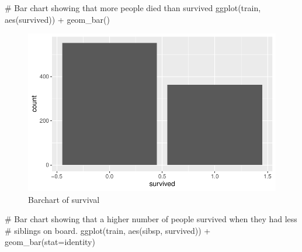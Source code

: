 \documentclass[
  letterpaper,
  DIV=11,
  numbers=noendperiod]{scrartcl}
\newenvironment{Shaded}{\begin{snugshade}}{\end{snugshade}}
\newcommand{\AttributeTok}[1]{\textcolor[rgb]{0.40,0.45,0.13}{#1}}
\newcommand{\CommentTok}[1]{\textcolor[rgb]{0.37,0.37,0.37}{#1}}
\newcommand{\FunctionTok}[1]{\textcolor[rgb]{0.28,0.35,0.67}{#1}}
\newcommand{\NormalTok}[1]{\textcolor[rgb]{0.00,0.23,0.31}{#1}}
\newcommand{\SpecialCharTok}[1]{\textcolor[rgb]{0.37,0.37,0.37}{#1}}
\newcommand{\StringTok}[1]{\textcolor[rgb]{0.13,0.47,0.30}{#1}}
\begin{document}
\begin{Shaded}
\begin{Highlighting}[]
\CommentTok{\# Bar chart showing that more people died than survived}
\FunctionTok{ggplot}\NormalTok{(train, }\FunctionTok{aes}\NormalTok{(survived)) }\SpecialCharTok{+}
  \FunctionTok{geom\_bar}\NormalTok{()}
\end{Highlighting}
\end{Shaded}

\begin{figure}[H]

{\centering \includegraphics{FinalProject_files/figure-pdf/unnamed-chunk-12-1.pdf}

}

\caption{Barchart of survival}

\end{figure}%

\begin{Shaded}
\begin{Highlighting}[]
\CommentTok{\# Bar chart showing that a higher number of people survived when they had less }
\CommentTok{\# siblings on board.}
\FunctionTok{ggplot}\NormalTok{(train, }\FunctionTok{aes}\NormalTok{(sibsp, survived)) }\SpecialCharTok{+}
  \FunctionTok{geom\_bar}\NormalTok{(}\AttributeTok{stat=}\StringTok{\textquotesingle{}identity\textquotesingle{}}\NormalTok{)}
\end{Highlighting}
\end{Shaded}
\end{document}
